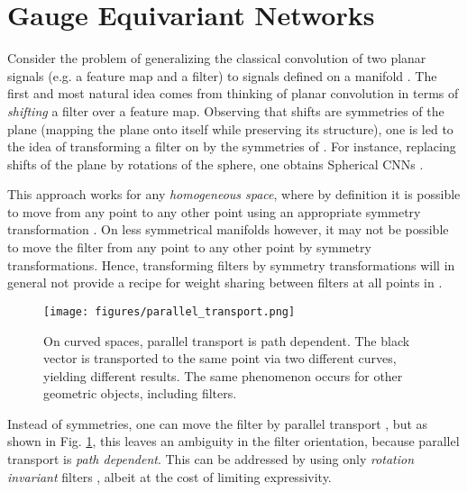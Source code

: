 \documentclass{article}
\begin{document}
\section{Gauge Equivariant Networks}
\label{sec:gauge_equivariant_networks}

Consider the problem of generalizing the classical convolution of two planar signals (e.g. a feature map and a filter) to signals defined on a manifold .
The first and most natural idea comes from thinking of planar convolution in terms of \emph{shifting} a filter over a feature map.
Observing that shifts are symmetries of the plane (mapping the plane onto itself while preserving its structure), one is led to the idea of transforming a filter on  by the symmetries of .
For instance, replacing shifts of the plane by rotations of the sphere, one obtains Spherical CNNs \cite{cohenSphericalCNNs2018}.

This approach works for any \emph{homogeneous space}, where by definition it is possible to move from any point  to any other point  using an appropriate symmetry transformation \cite{kondorGeneralizationEquivarianceConvolution2018, cohenIntertwinersInducedRepresentations2018, cohenGeneralTheoryEquivariant2018}.
On less symmetrical manifolds however, it may not be possible to move the filter from any point to any other point by symmetry transformations.
Hence, transforming filters by symmetry transformations will in general not provide a recipe for weight sharing between filters at all points in .

\begin{figure}
  \centering
  \begin{minipage}[c]{0.18\textwidth}
    \texttt{[image: figures/parallel\_transport.png]}
  \end{minipage}\hfill
  \begin{minipage}[c]{0.3\textwidth}
  \vspace{-0.8 \baselineskip}
  \caption{
       On curved spaces, parallel transport is path dependent. The black vector is transported to the same point via two different curves, yielding different results. The same phenomenon occurs for other geometric objects, including filters.
  }
  \label{fig:parallel_transport}
  \end{minipage}
\end{figure}


Instead of symmetries, one can move the filter by parallel transport \cite{schonsheckParallelTransportConvolution2018}, but as shown in Fig. \ref{fig:parallel_transport}, this leaves an ambiguity in the filter orientation, because parallel transport is \emph{path dependent}.
This can be addressed by using only \emph{rotation invariant} filters \cite{boscainiLearningClassSpecific2015, brunaSpectralNetworksDeep}, albeit at the cost of limiting expressivity.
\end{document}
